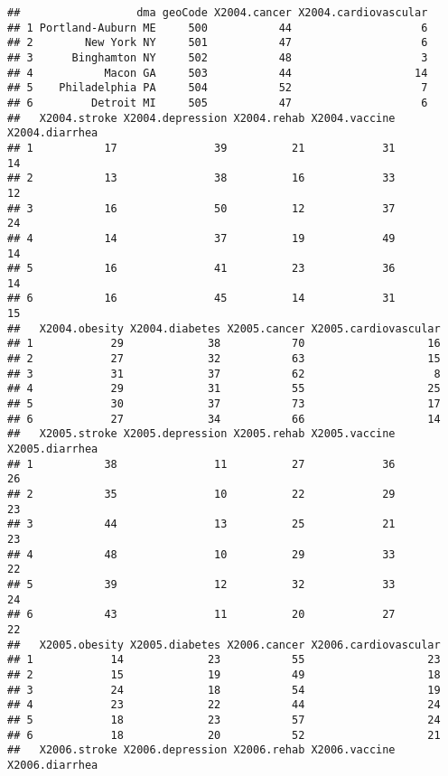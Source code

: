 \documentclass[]{article}
\begin{document}
\begin{verbatim}
##                  dma geoCode X2004.cancer X2004.cardiovascular
## 1 Portland-Auburn ME     500           44                    6
## 2        New York NY     501           47                    6
## 3      Binghamton NY     502           48                    3
## 4           Macon GA     503           44                   14
## 5    Philadelphia PA     504           52                    7
## 6         Detroit MI     505           47                    6
##   X2004.stroke X2004.depression X2004.rehab X2004.vaccine X2004.diarrhea
## 1           17               39          21            31             14
## 2           13               38          16            33             12
## 3           16               50          12            37             24
## 4           14               37          19            49             14
## 5           16               41          23            36             14
## 6           16               45          14            31             15
##   X2004.obesity X2004.diabetes X2005.cancer X2005.cardiovascular
## 1            29             38           70                   16
## 2            27             32           63                   15
## 3            31             37           62                    8
## 4            29             31           55                   25
## 5            30             37           73                   17
## 6            27             34           66                   14
##   X2005.stroke X2005.depression X2005.rehab X2005.vaccine X2005.diarrhea
## 1           38               11          27            36             26
## 2           35               10          22            29             23
## 3           44               13          25            21             23
## 4           48               10          29            33             22
## 5           39               12          32            33             24
## 6           43               11          20            27             22
##   X2005.obesity X2005.diabetes X2006.cancer X2006.cardiovascular
## 1            14             23           55                   23
## 2            15             19           49                   18
## 3            24             18           54                   19
## 4            23             22           44                   24
## 5            18             23           57                   24
## 6            18             20           52                   21
##   X2006.stroke X2006.depression X2006.rehab X2006.vaccine X2006.diarrhea

\end{verbatim}
\end{document}
